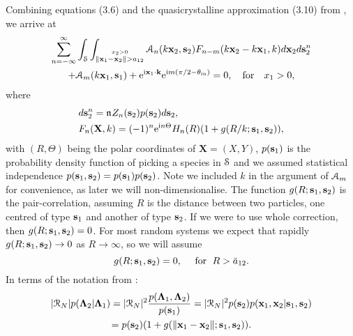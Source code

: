 \documentclass[12pt, a4paper]{article}
\begin{document}
Combining equations (3.6) and the quasicrystalline approximation (3.10) from \parencite{gower_reflection_2018}, we arrive at
\begin{multline}
 \sum_{n=-\infty}^\infty \int_\mathcal S \int_{\stackrel{x_2 > 0 }{\|\mathbf x_1 - \mathbf x_2 \| > a_{12}}}  \mathcal A_n (k \mathbf x_2, \mathbf s_2) F_{n-m}(k\mathbf x_2 - k \mathbf x_1,k)  d \mathbf x_2 d\mathbf s_2^n
\\
+  \mathcal A_m (k\mathbf x_1, \mathbf s_1) + \textrm{e}^{\textrm{i} \mathbf x_1 \cdot \mathbf k } \textrm{e}^{\textrm{i} m ( \pi/2 - \theta_{\mathrm{in}} )}
   = 0, \quad \text{for} \quad x_1 >0,
  \label{eqn:ensemAsystem}
\end{multline}
where
\begin{align}
  & d\mathbf s_2^n = \mathfrak n_{} Z_n (\mathbf s_2) p(\mathbf s_2) d\mathbf s_2,
  \\
  & F_{n}(\mathbf X,k) = (-1)^{n}\textrm{e}^{\textrm{i} n \Theta} H_{n}(R)( 1 + g(R/k;  \mathbf s_1,\mathbf s_2)),
  \label{eqn:integral_kernel}
\end{align}
with $(R,\Theta)$ being the polar coordinates of $\mathbf X = (X,Y)$,
$p(\mathbf s_1)$ is the probability density function of picking a species in $\mathcal S$ and we assumed statistical independence $p(\mathbf s_1, \mathbf s_2) = p(\mathbf s_1)p(\mathbf s_2)$. Note we included $k$ in the argument of $\mathcal A_m$ for convenience, as later we will non-dimensionalise. The function $g(R; \mathbf s_1,\mathbf s_2)$ is the pair-correlation, assuming $R$ is the distance between two particles, one centred of type $\mathbf s_1$ and another of type $\mathbf s_2$. If we were to use whole correction, then $g(R; \mathbf s_1,\mathbf s_2) = 0$.
For most random systems we expect that rapidly $g(R; \mathbf s_1,\mathbf s_2) \to 0$ as $R \to \infty$, so we will assume
\begin{equation}
  g(R; \mathbf s_1,\mathbf s_2) = 0, \quad \text{ for } \; R > \bar a_{12}.
  \label{eqn:pair_correlation}
\end{equation}
In terms of the notation from \parencite{gower_reflection_2018}:
\begin{multline}
  |\mathcal R_N| p(\boldsymbol{\Lambda}_{2} | \boldsymbol{\Lambda}_{1}) = |\mathcal R_N|^2 \frac{p(\boldsymbol{\Lambda}_{1}, \boldsymbol{\Lambda}_{2})}{p(\mathbf s_1)} = |\mathcal R_N|^2 p(\mathbf s_2) p(\mathbf x_1, \mathbf x_2 | \mathbf s_1,\mathbf s_2)
  \\ = p(\mathbf s_2)(1 + g(\|\mathbf x_1 - \mathbf x_2\|;  \mathbf s_1,\mathbf s_2)).
\end{multline}
\end{document}
